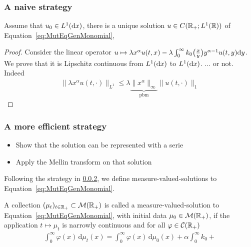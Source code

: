 \documentclass[11pt]{amsart}
\newcommand{\diff}{\,\mathrm{d}}
\begin{document}
\subsubsection{A naive strategy}
\begin{theorem} Assume that $u_0 \in L^1(\mathrm dx)$, there is a unique solution $u \in C(\mathbb{R}_+ ; L^1(\mathbb{R}))$ of Equation~\eqref{eq:MutEqGenMonomial}, 
\end{theorem}
\begin{proof}
    Consider the linear operator $u \mapsto \lambda x^{\alpha} u(t,x) - \lambda \int_0^{\infty} k_0\big(\frac{x}{y}\big) y^{\alpha-1} u(t,y) \mathrm dy$.  We prove that it is Lipschitz continuous from $L^1(\mathrm dx)$ to $L^1(\mathrm dx)$. ... or not. Indeed
        \begin{align*}
             \|\lambda x^{\alpha} u(t,\cdot) \|_{L^1} 
             \leq
             \lambda \underbrace{\| x^{\alpha} \|_{\infty}}_{\text{pbm}} \| u(t,\cdot) \|_1
        \end{align*}
\end{proof}

\subsubsection{A more efficient strategy}

\begin{itemize}
    \item Show that the solution can be represented with a serie
    \item Apply the Mellin transform on that solution
\end{itemize}

Following the strategy in \ref{}, we define measure-valued-solutions to Equation~\eqref{eq:MutEqGenMonomial}. 

\begin{definition}
    A collection $(\mu_t)_{t \in \mathbb{R}_+} \subset \mathcal{M}(\mathbb{R}_+)$ is called a measure-valued-solution to Equation~\eqref{eq:MutEqGenMonomial}, with initial data $\mu_0 \in \mathcal{M}(\mathbb{R}_+)$, if the application $t \mapsto \mu_t$ is narrowly continuous and for all $\varphi \in \mathcal{C}(\mathbb{R}_+)$
    \begin{align*}
       \int_0^{\infty} \varphi(x)\diff\mu_t(x) =\int_0^{\infty} \varphi(x)\diff\mu_0(x) + \alpha \int_0^{\infty}k_0 + 
    \end{align*}
\end{definition}

\begin{theorem}[Uniqueness]
    
\end{theorem}
\end{document}

